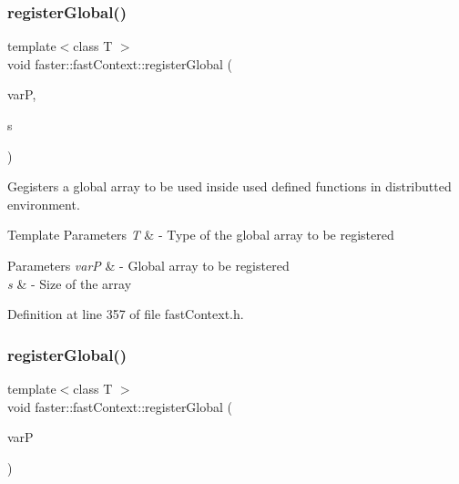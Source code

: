 \hypertarget{classfaster_1_1fastContext_a569dc3296b036b0d159a35fd7eb37cbe}{}\label{classfaster_1_1fastContext_a569dc3296b036b0d159a35fd7eb37cbe} 
\subsubsection{\texorpdfstring{register\+Global()}{registerGlobal()}\hspace{0.1cm}{\footnotesize\ttfamily [2/3]}}
{\footnotesize\ttfamily template$<$class T $>$ \\
void faster\+::fast\+Context\+::register\+Global (\begin{DoxyParamCaption}\item[{T $\ast$$\ast$}]{varP,  }\item[{size\+\_\+t}]{s }\end{DoxyParamCaption})}



Gegisters a global array to be used inside used defined functions in distributted environment. 


\begin{DoxyTemplParams}{Template Parameters}
{\em T} & -\/ Type of the global array to be registered \\
\hline
\end{DoxyTemplParams}

\begin{DoxyParams}{Parameters}
{\em varP} & -\/ Global array to be registered \\
\hline
{\em s} & -\/ Size of the array \\
\hline
\end{DoxyParams}


Definition at line 357 of file fast\+Context.\+h.

\hypertarget{classfaster_1_1fastContext_a9cfc7e3b62baca68c7c5a1ddba548691}{}\label{classfaster_1_1fastContext_a9cfc7e3b62baca68c7c5a1ddba548691} 
\subsubsection{\texorpdfstring{register\+Global()}{registerGlobal()}\hspace{0.1cm}{\footnotesize\ttfamily [3/3]}}
{\footnotesize\ttfamily template$<$class T $>$ \\
void faster\+::fast\+Context\+::register\+Global (\begin{DoxyParamCaption}\item[{std\+::vector$<$ T $>$ $\ast$}]{varP }\end{DoxyParamCaption})}



